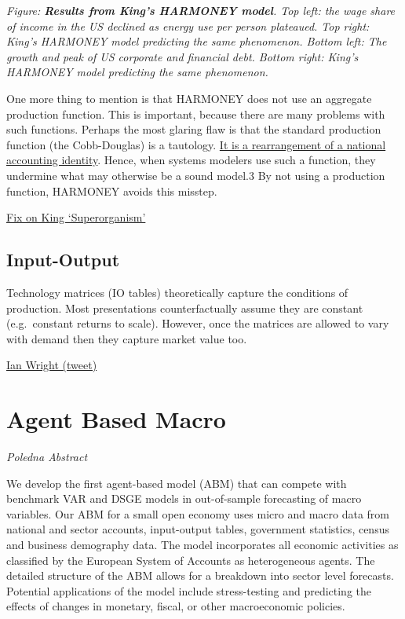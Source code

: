 \documentclass[
]{book}
\begin{document}
\emph{Figure: \textbf{Results from King's HARMONEY model}. Top left: the wage share of income in the US declined as energy use per person plateaued. Top right: King's HARMONEY model predicting the same phenomenon. Bottom left: The growth and peak of US corporate and financial debt. Bottom right: King's HARMONEY model predicting the same phenomenon.}

One more thing to mention is that HARMONEY does not use an aggregate production function. This is important, because there are many problems with such functions. Perhaps the most glaring flaw is that the standard production function (the Cobb-Douglas) is a tautology. \href{https://economicsfromthetopdown.com/2020/06/10/economic-growth-theory-bah-humbug/}{It is a rearrangement of a national accounting identity}. Hence, when systems modelers use such a function, they undermine what may otherwise be a sound model.3 By not using a production function, HARMONEY avoids this misstep.

\href{https://economicsfromthetopdown.com/2021/03/05/a-review-of-carey-kings-the-economic-superorganism/}{Fix on King `Superorganism'}

\hypertarget{input-output}{%
\section{Input-Output}\label{input-output}}

Technology matrices (IO tables) theoretically capture the conditions of production. Most presentations counterfactually assume they are constant (e.g.~constant returns to scale). However, once the matrices are allowed to vary with demand then they capture market value too.

\href{https://twitter.com/ianpaulwright/status/1552159460277239810}{Ian Wright (tweet)}

\hypertarget{agent-based-macro}{%
\chapter{Agent Based Macro}\label{agent-based-macro}}

\emph{Poledna Abstract}

We develop the first agent-based model (ABM) that can compete with benchmark VAR and DSGE models in
out-of-sample forecasting of macro variables. Our ABM for a small open economy uses micro and macro data
from national and sector accounts, input-output tables, government statistics, census and business demography
data. The model incorporates all economic activities as classified by the European System of Accounts as
heterogeneous agents. The detailed structure of the ABM allows for a breakdown into sector level forecasts.
Potential applications of the model include stress-testing and predicting the effects of changes in monetary,
fiscal, or other macroeconomic policies.
\end{document}
